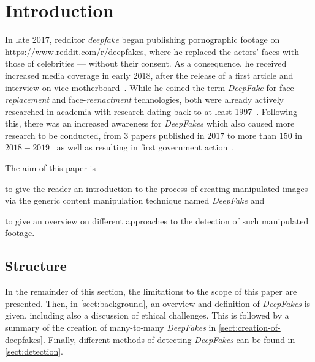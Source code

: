 \section{Introduction}
In late 2017, \gls{redditor} \textit{deepfake} began publishing pornographic footage
on \url{https://www.reddit.com/r/deepfakes}, where he replaced the actors' faces
with those of celebrities --- without their consent. As a consequence, he
received increased media coverage in early 2018, after the release of a first 
article and interview on vice-motherboard~\cite{Cole.2017}. While he coined the
term \textit{DeepFake} for face-\textit{replacement} and face-\textit{reenactment}
technologies, both were already actively researched in academia with research 
dating back to at least 1997~\cite{Bregler.1997}.
Following this, there was an increased awareness for \textit{DeepFakes} which also
caused more research to be conducted, from \(3\) papers published in \(2017\) to
more than \(150\) in \(2018-2019\)~\cite{mirsky_creation_2020} as well as
resulting in first government action~\cite{senate_-_homeland_security_and_governmental_affairs__house_-_energy_and_commerce_deepfake_2019}.

\par
The aim of this paper is
\begin{enumerate*}[a.)]
    \item to give the reader an introduction to the process of creating manipulated
    images via the generic content manipulation technique named \textit{DeepFake}
    and
    \item to give an overview on different approaches to the detection of such manipulated footage.
\end{enumerate*}

\subsection{Structure}
In the remainder of this section, the limitations to the scope of this paper are
presented. Then, in \cref{sect:background}, an overview and definition of \textit{DeepFakes}
is given, including also a discussion of ethical challenges.
This is followed by a summary of the creation of many-to-many \textit{DeepFakes}
in \cref{sect:creation-of-deepfakes}. Finally, different methods of detecting
\textit{DeepFakes} can be found in \cref{sect:detection}.

